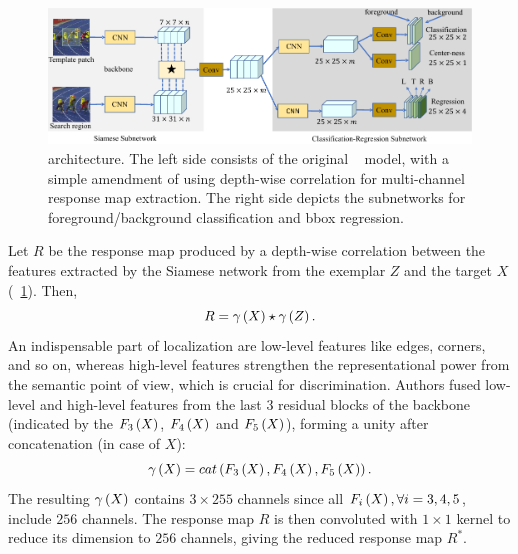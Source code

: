 \begin{figure}[t]
    \centerline{\includegraphics[width=\linewidth]{figures/theoretical_foundations/siamcar_architecture.pdf}}
    \caption[ architecture]{ architecture. The left side consists of the original ~\cite{bertinetto2016siamfc} model, with a simple amendment of using depth-wise correlation for multi-channel response map extraction. The right side depicts the subnetworks for foreground/background classification and \gls{bbox} regression. }
    \label{fig:SiamCARArchitecture}
\end{figure}

Let $R$ be the response map produced by a depth-wise correlation between the features extracted by the Siamese network from the exemplar $Z$ and the target $X$ (\figstr{}~\ref{fig:SiamCARArchitecture}). Then,
\begin{equation}
    R = {\gamma} \left( X \right) \star {\gamma} \left( Z \right).
\end{equation}
An indispensable part of localization are low-level features like edges, corners, and so on, whereas high-level features strengthen the representational power from the semantic point of view, which is crucial for discrimination. Authors fused low-level and high-level features from the last $3$ residual blocks of the  backbone (indicated by the ${F_3} \left( X \right)$, ${F_4} \left( X \right)$ and ${F_5} \left( X \right)$), forming a unity after concatenation (in case of $X$):
\begin{equation}
    {\gamma} \left( X \right) = {cat} \left( {F_3} \left( X \right), {F_4} \left( X \right), {F_5} \left( X \right) \right).
\end{equation}
The resulting ${\gamma} \left( X \right)$ contains $3 \times 255$ channels since all ${F_i} \left( X \right), \forall i = 3, 4, 5$, include $256$ channels. The response map $R$ is then convoluted with $1 \times 1$ kernel to reduce its dimension to $256$ channels, giving the reduced response map $R^*$.

